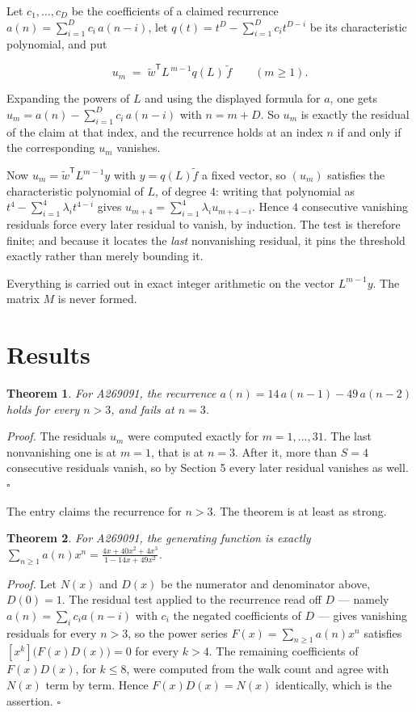 \documentclass[11pt]{article}
\newtheorem{theorem}{Theorem}
\theoremstyle{definition}
\begin{document}
Let $c_1,\dots,c_D$ be the coefficients of a claimed recurrence $a(n) = \sum_{i=1}^{D} c_i\,a(n-i)$, let $q(t) = t^{D} - \sum_{i=1}^{D} c_i t^{D-i}$ be its characteristic polynomial, and put

\[u_m \;=\; \tilde w^{\mathsf T} L^{\,m-1} q(L)\,\tilde f \qquad (m \ge 1).\]

Expanding the powers of $L$ and using the displayed formula for $a$, one gets $u_m = a(n) - \sum_{i=1}^{D} c_i\,a(n-i)$ with $n = m + D$. So $u_m$ is exactly the residual of the claim at that index, and the recurrence holds at an index $n$ if and only if the corresponding $u_m$ vanishes.

Now $u_m = \tilde w^{\mathsf T} L^{m-1} y$ with $y = q(L)\tilde f$ a fixed vector, so $(u_m)$ satisfies the characteristic polynomial of $L$, of degree $4$: writing that polynomial as $t^{4} - \sum_{i=1}^{4} \lambda_i t^{4-i}$ gives $u_{m+4} = \sum_{i=1}^{4} \lambda_i u_{m+4-i}$. Hence $4$ consecutive vanishing residuals force every later residual to vanish, by induction. The test is therefore finite; and because it locates the {\itshape last} nonvanishing residual, it pins the threshold exactly rather than merely bounding it.

Everything is carried out in exact integer arithmetic on the vector $L^{m-1}y$. The matrix $M$ is never formed.

\section{Results}

\begin{theorem} For A269091, the recurrence $a(n) = 14\,a(n-1) - 49\,a(n-2)$ holds for every $n > 3$, and fails at $n = 3$.\end{theorem}

{\itshape Proof.} The residuals $u_m$ were computed exactly for $m = 1,\dots,31$. The last nonvanishing one is at $m = 1$, that is at $n = 3$. After it, more than $S = 4$ consecutive residuals vanish, so by Section 5 every later residual vanishes as well. $\square$

The entry claims the recurrence for $n > 3$. The theorem is at least as strong.

\begin{theorem} For A269091, the generating function is exactly $\sum_{n\ge 1} a(n)x^n = \frac{4x + 40x^{2} + 4x^{3}}{1 - 14x + 49x^{2}}$.\end{theorem}

{\itshape Proof.} Let $N(x)$ and $D(x)$ be the numerator and denominator above, $D(0)=1$. The residual test applied to the recurrence read off $D$ --- namely $a(n) = \sum_i c_i a(n-i)$ with $c_i$ the negated coefficients of $D$ --- gives vanishing residuals for every $n > 3$, so the power series $F(x)=\sum_{n\ge 1}a(n)x^n$ satisfies $[x^k]\bigl(F(x)D(x)\bigr) = 0$ for every $k > 4$. The remaining coefficients of $F(x)D(x)$, for $k \le 8$, were computed from the walk count and agree with $N(x)$ term by term. Hence $F(x)D(x) = N(x)$ identically, which is the assertion. $\square$
\end{document}

